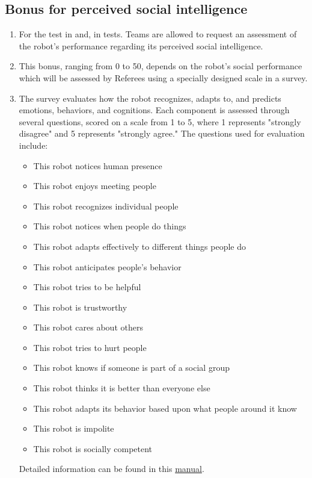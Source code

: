 \subsection{Bonus for perceived social intelligence}\label{rule:perceived_intelligence}
\begin{enumerate}	
    \item For the test  in  and,  in  tests. Teams are allowed to request an assessment of the robot's performance regarding its perceived social intelligence.
    
    \item This bonus, ranging from 0 to 50, depends on the robot's social performance which will be assessed by Referees using a specially designed scale in a survey.

    \item The survey evaluates how the robot recognizes, adapts to, and predicts emotions, behaviors, and cognitions. Each component is assessed through several questions, scored on a scale from 1 to 5, where 1 represents "strongly disagree" and 5 represents "strongly agree." The questions used for evaluation include:
    \begin{itemize}
        \item This robot notices human presence
        \item This robot enjoys meeting people
        \item This robot recognizes individual people
        \item This robot notices when people do things
        \item This robot adapts effectively to different things people do
        \item This robot anticipates people's behavior
        \item This robot tries to be helpful
        \item This robot is trustworthy
        \item This robot cares about others
        \item This robot tries to hurt people
        \item This robot knows if someone is part of a social group
        \item This robot thinks it is better than everyone else
        \item This robot adapts its behavior based upon what people around it know
        \item This robot is impolite
        \item This robot is socially competent
    \end{itemize}
    Detailed information can be found in this \href{https://ipip.ori.org/PSIManualSeptember2018.pdf}{manual}.
    

\end{enumerate}
